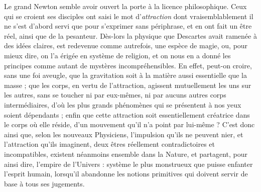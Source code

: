 \documentclass[a4paper, 11pt, oneside, polutonikogreek, french]{article}
\begin{document}
Le grand Newton semble avoir ouvert la porte à la licence philosophique. Ceux qui se croient ses disciples ont saisi le mot d'\emph{attraction} dont vraisemblablement il ne s'est d'abord servi que pour s'exprimer sans périphrase, et en ont fait un être réel, ainsi que de la pesanteur. Dès-lors la physique que Descartes avait ramenée à des idées claires, est redevenue comme autrefois, une espèce de magie, ou, pour mieux dire, on l'a érigée en système de religion, et on nous en a donné les principes comme autant de mystères incompréhensibles. En effet, peut-on croire, sans une foi aveugle, que la gravitation soit à la matière aussi essentielle que la masse ; que les corps, en vertu de l'attraction, agissent mutuellement les uns sur les autres, sans se toucher ni par eux-mêmes, ni par aucuns autres corps intermédiaires, d'où les plus grands phénomènes qui se présentent à nos yeux soient dépendants ; enfin que cette attraction soit essentiellement créatrice dans le corps où elle réside, d'un mouvement qu'il n'a point par lui-même ? C'est donc ainsi que, selon les nouveaux Physiciens, l'impulsion qu'ils ne peuvent nier, et l'attraction qu'ils imaginent, deux êtres réellement contradictoires et incompatibles, existent néanmoins ensemble dans la Nature, et partagent, pour ainsi dire, l'empire de l'Univers : système le plus monstrueux que puisse enfanter l'esprit humain, lorsqu'il abandonne les notions primitives qui doivent servir de base à tous ses jugements.
\end{document}
